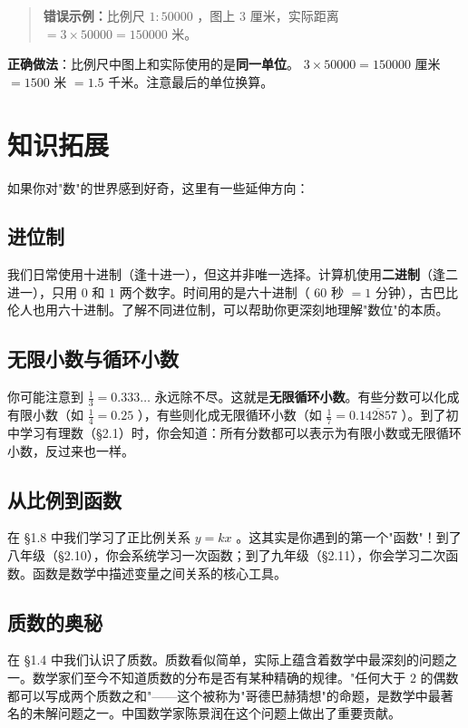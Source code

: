 \begin{quote}\textbf{错误示例：}比例尺 $1 : 50000$ ，图上 $3$ 厘米，实际距离 $= 3 \times 50000 = 150000$ 米。\end{quote}


\textbf{正确做法}：比例尺中图上和实际使用的是\textbf{同一单位}。 $3 \times 50000 = 150000$ 厘米 $= 1500$ 米 $= 1.5$ 千米。注意最后的单位换算。

\section*{知识拓展}


如果你对"数"的世界感到好奇，这里有一些延伸方向：

\subsection*{进位制}


我们日常使用十进制（逢十进一），但这并非唯一选择。计算机使用\textbf{二进制}（逢二进一），只用 $0$ 和 $1$ 两个数字。时间用的是六十进制（ $60$ 秒 $= 1$ 分钟），古巴比伦人也用六十进制。了解不同进位制，可以帮助你更深刻地理解"数位"的本质。

\subsection*{无限小数与循环小数}


你可能注意到 $\frac{1}{3} = 0.333\ldots$ 永远除不尽。这就是\textbf{无限循环小数}。有些分数可以化成有限小数（如 $\frac{1}{4} = 0.25$ ），有些则化成无限循环小数（如 $\frac{1}{7} = 0.\overline{142857}$ ）。到了初中学习有理数（§2.1）时，你会知道：所有分数都可以表示为有限小数或无限循环小数，反过来也一样。

\subsection*{从比例到函数}


在 §1.8 中我们学习了正比例关系 $y = kx$ 。这其实是你遇到的第一个"函数"！到了八年级（§2.10），你会系统学习一次函数；到了九年级（§2.11），你会学习二次函数。函数是数学中描述变量之间关系的核心工具。

\subsection*{质数的奥秘}


在 §1.4 中我们认识了质数。质数看似简单，实际上蕴含着数学中最深刻的问题之一。数学家们至今不知道质数的分布是否有某种精确的规律。"任何大于 $2$ 的偶数都可以写成两个质数之和"——这个被称为"哥德巴赫猜想"的命题，是数学中最著名的未解问题之一。中国数学家陈景润在这个问题上做出了重要贡献。
